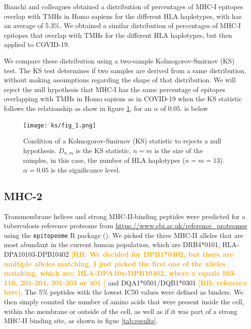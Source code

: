 \documentclass{article}
\newcommand{\richel}[1]{\textcolor{orange}{\textbf{[RB: #1]}}}
\begin{document}
Bianchi and colleagues obtained a distribution of 
percentages of MHC-I epitopes overlap with TMHs in Homo sapiens
for the different HLA haplotypes, with has an average of 5.3\%.
We obtained a similar distribution of percentages of MHC-I epitopes that 
overlap with TMHs for the different HLA haplotypes, but then applied to
COVID-19.

We compare these distribution using a two-sample 
Kolmogorov-Smirnov (KS) test. The KS test determines if two samples
are derived from a same distribution, without making assumptions
regarding the shape of that distribution. We will reject
the null hypothesis that MHC-I has the same percentage of epitopes 
overlapping with TMHs in Homo sapiens as in COVID-19 when 
the KS statistic follows the relationship as show in 
figure \ref{fig:ks}, for an $\alpha$ of $0.05$.
is below 

\begin{figure}[!htbp]
  \texttt{[image: ks/fig\_1.png]}
  \caption{
    Condition of a Kolmogorov-Smirnov (KS) statistic to rejects a null
    hypothesis. $D_{n,m}$ is the KS statistic, $n = m$ is the size
    of the samples, in this case, the number of HLA haplotypes ($n = m = 13$).
    $\alpha = 0.05$ is the significance level.
  }
  \label{fig:ks}
\end{figure}

\subsection{MHC-2}

\iffalse
	Transmembrane helices and strong MHC-II-binding peptides
	were predicted for a tuberculosis reference proteome 
	from \url{https://www.ebi.ac.uk/reference_proteomes}
	using the \verb;epitopeome; R package (\cite{epitopeome}).
	We picked the three MHC-II alleles that are most abundant 
	in the current human population, 
	which are DRB4*0101, HLA-DPA10103-DPB10402 
	\richel{
	  We decided for DPB1*0402, but there are multiple alleles matching.
	  I just picked the first one of the alleles matching, which are:
	  HLA-DPA10x-DPB10402, where x equals 103-110, 201-204, 301-303 or 401
	}
	and DQA1*0501/DQB1*0301 \richel{reference here}.
	The 5\% peptides with the lowest IC50 values were defined as binders.
	We then simply counted the number of amino acids that were present inside the
	cell, within the membrane or outside of the cell, as well as if it was part 
	of a strong MHC-II binding site, as shown in figue \ref{tab:results}.
\end{document}
